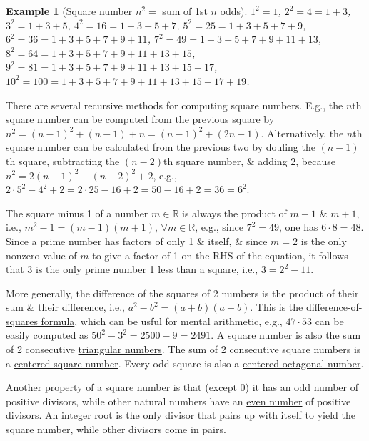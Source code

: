 \documentclass{article}
\newtheorem{example}{Example}
\begin{document}
\begin{example}[Square number $n^2 =$ sum of 1st $n$ odds]
	$1^2 = 1$, $2^2 = 4 = 1 + 3$, $3^2 = 1 + 3 + 5$, $4^2 = 16 = 1 + 3 + 5 + 7$, $5^2 = 25 = 1 + 3 + 5 + 7 + 9$, $6^2 = 36 = 1 + 3 + 5 + 7 + 9 + 11$, $7^2 = 49 = 1 + 3 + 5 + 7 + 9 + 11 + 13$, $8^2 = 64 = 1 + 3 + 5 + 7 + 9 + 11 + 13 + 15$, $9^2 = 81 = 1 + 3 + 5 + 7 + 9 + 11 + 13 + 15 + 17$, $10^2 = 100 = 1 + 3 + 5 + 7 + 9 + 11 + 13 + 15 + 17 + 19$.
\end{example}
There are several recursive methods for computing square numbers. E.g., the $n$th square number can be computed from the previous square by $n^2 = (n - 1)^2 + (n - 1) + n = (n - 1)^2 + (2n - 1)$. Alternatively, the $n$th square number can be calculated from the previous two by douling the $(n - 1)$th square, subtracting the $(n - 2)$th square number, \& adding 2, because $n^2 = 2(n - 1)^2  - (n - 2)^2 + 2$, e.g., $2\cdot5^2 - 4^2 + 2 = 2\cdot25 - 16 + 2 = 50 - 16 + 2 = 36 = 6^2$.

The square minus 1 of a number $m\in\mathbb{R}$ is always the product of $m - 1$ \& $m + 1$, i.e., $m^2 - 1 = (m - 1)(m + 1)$, $\forall m\in\mathbb{R}$, e.g., since $7^2 = 49$, one has $6\cdot8 = 48$. Since a prime number has factors of only 1 \& itself, \& since $m = 2$ is the only nonzero value of $m$ to give a factor of 1 on the RHS of the equation, it follows that $3$ is the only prime number 1 less than a square, i.e., $3 = 2^2 - 11$.

More generally, the difference of the squares of 2 numbers is the product of their sum \& their difference, i.e., $a^2 - b^2 = (a + b)(a - b)$. This is the \href{https://en.wikipedia.org/wiki/Difference_of_two_squares}{difference-of-squares formula}, which can be usful for mental arithmetic, e.g., $47\cdot53$ can be easily computed as $50^2 - 3^2 = 2500 - 9 = 2491$. A square number is also the sum of 2 consecutive \href{https://en.wikipedia.org/wiki/Triangular_number}{triangular numbers}. The sum of 2 consecutive square numbers is a \href{https://en.wikipedia.org/wiki/Centered_square_number}{centered square number}. Every odd square is also a \href{https://en.wikipedia.org/wiki/Centered_octagonal_number}{centered octagonal number}.

Another property of a square number is that (except 0) it has an odd number of positive divisors, while other natural numbers have an \href{https://en.wikipedia.org/wiki/Parity_(mathematics)}{even number} of positive divisors. An integer root is the only divisor that pairs up with itself to yield the square number, while other divisors come in pairs.
\end{document}

